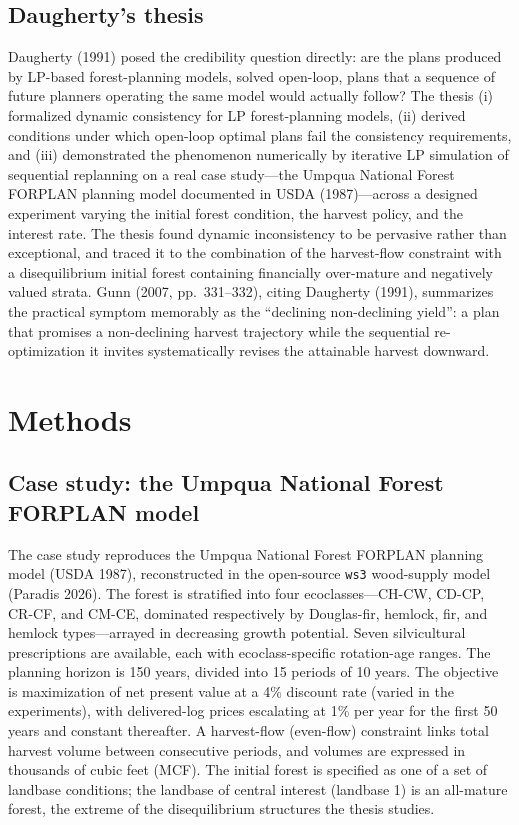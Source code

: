 \documentclass[12pt]{article}
\begin{document}
\hypertarget{daughertys-thesis}{%
\subsection{Daugherty's thesis}\label{daughertys-thesis}}

Daugherty (1991) posed the credibility question directly: are the plans produced by LP-based forest-planning models, solved open-loop, plans that a sequence of future planners operating the same model would actually follow? The thesis (i) formalized dynamic consistency for LP forest-planning models, (ii) derived conditions under which open-loop optimal plans fail the consistency requirements, and (iii) demonstrated the phenomenon numerically by iterative LP simulation of sequential replanning on a real case study---the Umpqua National Forest FORPLAN planning model documented in USDA (1987)---across a designed experiment varying the initial forest condition, the harvest policy, and the interest rate. The thesis found dynamic inconsistency to be pervasive rather than exceptional, and traced it to the combination of the harvest-flow constraint with a disequilibrium initial forest containing financially over-mature and negatively valued strata. Gunn (2007, pp.~331--332), citing Daugherty (1991), summarizes the practical symptom memorably as the ``declining non-declining yield'': a plan that promises a non-declining harvest trajectory while the sequential re-optimization it invites systematically revises the attainable harvest downward.

\hypertarget{methods}{%
\section{Methods}\label{methods}}

\hypertarget{case-study-the-umpqua-national-forest-forplan-model}{%
\subsection{Case study: the Umpqua National Forest FORPLAN model}\label{case-study-the-umpqua-national-forest-forplan-model}}

The case study reproduces the Umpqua National Forest FORPLAN planning model (USDA 1987), reconstructed in the open-source \texttt{ws3} wood-supply model (Paradis 2026). The forest is stratified into four ecoclasses---CH-CW, CD-CP, CR-CF, and CM-CE, dominated respectively by Douglas-fir, hemlock, fir, and hemlock types---arrayed in decreasing growth potential. Seven silvicultural prescriptions are available, each with ecoclass-specific rotation-age ranges. The planning horizon is 150 years, divided into 15 periods of 10 years. The objective is maximization of net present value at a 4\% discount rate (varied in the experiments), with delivered-log prices escalating at 1\% per year for the first 50 years and constant thereafter. A harvest-flow (even-flow) constraint links total harvest volume between consecutive periods, and volumes are expressed in thousands of cubic feet (MCF). The initial forest is specified as one of a set of landbase conditions; the landbase of central interest (landbase 1) is an all-mature forest, the extreme of the disequilibrium structures the thesis studies.
\end{document}
